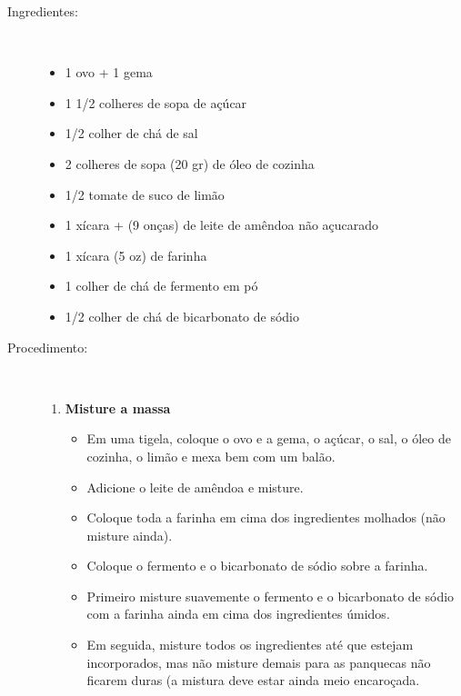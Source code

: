 \documentclass [11pt, letterpaper] {article}
\begin{document}
\begin {description}

\item [Ingredientes:] \ \\
\begin {itemize}
\item 1 ovo + 1 gema
\item 1 1/2 colheres de sopa de açúcar
\item 1/2 colher de chá de sal
\item 2 colheres de sopa (20 gr) de óleo de cozinha
\item 1/2 tomate de suco de limão
\item 1 xícara + (9 onças) de leite de amêndoa não açucarado
\item 1 xícara (5 oz) de farinha
\item 1 colher de chá de fermento em pó
\item 1/2 colher de chá de bicarbonato de sódio
\end {itemize}


\item [Procedimento:] \ \\

\begin {enumerate}
\item {\bf Misture a massa}
\begin {itemize}
\item Em uma tigela, coloque o ovo e a gema, o açúcar, o sal, o óleo de cozinha, o limão e mexa bem com um bal\~ao.
\item Adicione o leite de amêndoa e misture.
\item Coloque toda a farinha em cima dos ingredientes molhados (não misture ainda).
\item Coloque o fermento e o bicarbonato de sódio sobre a farinha.
\item Primeiro misture suavemente o fermento e o bicarbonato de sódio com a farinha ainda em cima dos ingredientes úmidos.
\item Em seguida, misture todos os ingredientes até que estejam
incorporados, mas não misture demais para as panquecas n\~ao ficarem
duras (a mistura deve estar ainda meio encaro\c{c}ada.
\end {itemize}


\end{enumerate}
\end{description}
\end{document}

